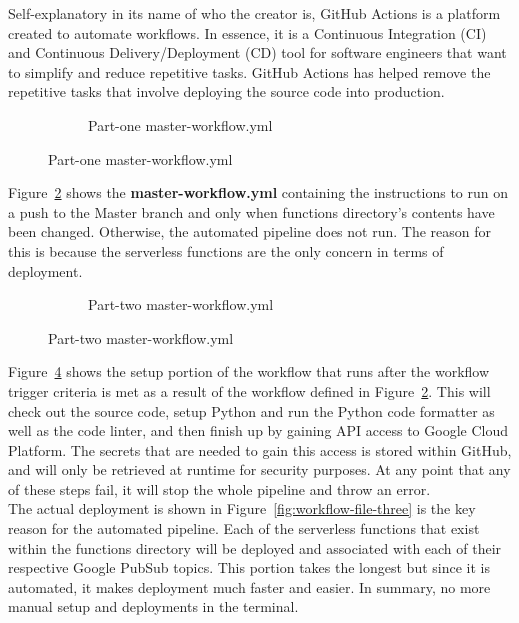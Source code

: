 \documentclass{article}
\begin{document}
Self-explanatory in its name of who the creator is, GitHub Actions is a platform created to automate workflows. In essence, it is a Continuous Integration (CI) and Continuous Delivery/Deployment (CD) tool for software engineers that want to simplify and reduce repetitive tasks. GitHub Actions has helped remove the repetitive tasks that involve deploying the source code into production.

\begin{figure}[H]
	\begin{figure}[H]
		
		\caption{Part-one master-workflow.yml}
		\label{fig:workflow-file-one}
	\end{figure}
\end{figure}

Figure~\ref{fig:workflow-file-one} shows the \textbf{master-workflow.yml} containing the instructions to run on a push to the Master branch and only when functions directory's contents have been changed. Otherwise, the automated pipeline does not run. The reason for this is because the serverless functions are the only concern in terms of deployment.

\begin{figure}[H]
	\begin{figure}[H]
		
		\caption{Part-two master-workflow.yml}
		\label{fig:workflow-file-two}
	\end{figure}
\end{figure}

Figure~\ref{fig:workflow-file-two} shows the setup portion of the workflow that runs after the workflow trigger criteria is met as a result of the workflow defined in Figure~\ref{fig:workflow-file-one}. This will check out the source code, setup Python and run the Python code formatter as well as the code linter, and then finish up by gaining API access to Google Cloud Platform. The secrets that are needed to gain this access is stored within GitHub, and will only be retrieved at runtime for security purposes. At any point that any of these steps fail, it will stop the whole pipeline and throw an error.\\

The actual deployment is shown in Figure~\ref{fig:workflow-file-three} is the key reason for the automated pipeline. Each of the serverless functions that exist within the functions directory will be deployed and associated with each of their respective Google PubSub topics. This portion takes the longest but since it is automated, it makes deployment much faster and easier. In summary, no more manual setup and deployments in the terminal.
\end{document}
